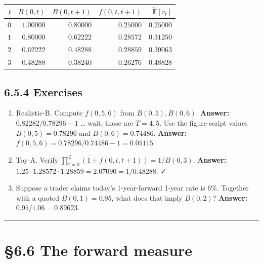 \documentclass[
  10pt,
  twoside]{book}
\newcounter{none} %
\providecommand{\tightlist}{%
  \setlength{\itemsep}{0pt}\setlength{\parskip}{0pt}}
\begin{document}
{\def\LTcaptype{none} %
\begin{table}[H]
\centering
\begin{tabular}{|r|r|r|r|r|}
\toprule
\(t\) & \(B(0, t)\) & \(B(0, t+1)\) & \(f(0, t, t+1)\) & \(\tilde{\mathbb E}[r_t]\) \\
\midrule



\(0\) & \(1.00000\) & \(0.80000\) & \(0.25000\) & \(0.25000\) \\
\(1\) & \(0.80000\) & \(0.62222\) & \(0.28572\) & \(0.31250\) \\
\(2\) & \(0.62222\) & \(0.48288\) & \(0.28859\) & \(0.39063\) \\
\(3\) & \(0.48288\) & \(0.38240\) & \(0.26276\) & \(0.48828\) \\
\bottomrule
\end{tabular}
\end{table}
}

\subsection{6.5.4 Exercises}\label{exercises-31}

\begin{enumerate}
\def\labelenumi{\arabic{enumi}.}
\tightlist
\item
  Realistic-B. Compute \(f(0, 5, 6)\) from \(B(0, 5), B(0, 6)\).
  \textbf{Answer:} \(0.82282/0.78296 - 1\) \ldots{} wait, those are
  \(T=4,5\). Use the figure-script values \(B(0,5) = 0.78296\) and
  \(B(0,6) = 0.74486\). \textbf{Answer:}
  \(f(0, 5, 6) = 0.78296/0.74486 - 1 = 0.05115\).
\item
  Toy-A. Verify \(\prod_{t=0}^{2}(1 + f(0, t, t+1)) = 1/B(0, 3)\).
  \textbf{Answer:}
  \(1.25 \cdot 1.28572 \cdot 1.28859 = 2.07090 = 1/0.48288\). ✓
\item
  Suppose a trader claims today's 1-year-forward 1-year rate is \(6\%\).
  Together with a quoted \(B(0, 1) = 0.95\), what does that imply
  \(B(0, 2)\)? \textbf{Answer:} \(0.95/1.06 = 0.89623\).
\end{enumerate}

\begin{center}\rule{0.5\linewidth}{0.5pt}\end{center}

\section{§6.6 The forward measure}\label{the-forward-measure}
\end{document}
